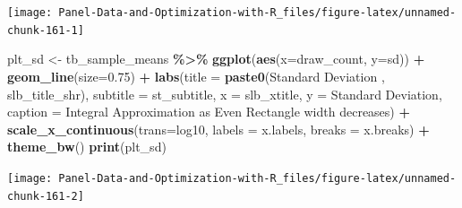 \documentclass[
]{book}
\newenvironment{Shaded}{\begin{snugshade}}{\end{snugshade}}
\newcommand{\DataTypeTok}[1]{\textcolor[rgb]{0.13,0.29,0.53}{#1}}
\newcommand{\FloatTok}[1]{\textcolor[rgb]{0.00,0.00,0.81}{#1}}
\newcommand{\KeywordTok}[1]{\textcolor[rgb]{0.13,0.29,0.53}{\textbf{#1}}}
\newcommand{\NormalTok}[1]{#1}
\newcommand{\OperatorTok}[1]{\textcolor[rgb]{0.81,0.36,0.00}{\textbf{#1}}}
\newcommand{\StringTok}[1]{\textcolor[rgb]{0.31,0.60,0.02}{#1}}
\begin{document}
\begin{center}\texttt{[image: Panel-Data-and-Optimization-with-R\_files/figure-latex/unnamed-chunk-161-1]} \end{center}

\begin{Shaded}
\begin{Highlighting}[]
\NormalTok{plt\_sd \textless{}{-}}\StringTok{ }\NormalTok{tb\_sample\_means }\OperatorTok{\%\textgreater{}\%}
\StringTok{  }\KeywordTok{ggplot}\NormalTok{(}\KeywordTok{aes}\NormalTok{(}\DataTypeTok{x=}\NormalTok{draw\_count, }\DataTypeTok{y=}\NormalTok{sd)) }\OperatorTok{+}
\StringTok{  }\KeywordTok{geom\_line}\NormalTok{(}\DataTypeTok{size=}\FloatTok{0.75}\NormalTok{) }\OperatorTok{+}
\StringTok{  }\KeywordTok{labs}\NormalTok{(}\DataTypeTok{title =} \KeywordTok{paste0}\NormalTok{(}\StringTok{\textquotesingle{}Standard Deviation \textquotesingle{}}\NormalTok{, slb\_title\_shr),}
       \DataTypeTok{subtitle =}\NormalTok{ st\_subtitle,}
       \DataTypeTok{x =}\NormalTok{ slb\_xtitle,}
       \DataTypeTok{y =} \StringTok{\textquotesingle{}Standard Deviation\textquotesingle{}}\NormalTok{,}
       \DataTypeTok{caption =} \StringTok{\textquotesingle{}Integral Approximation as Even Rectangle width decreases\textquotesingle{}}\NormalTok{) }\OperatorTok{+}
\StringTok{  }\KeywordTok{scale\_x\_continuous}\NormalTok{(}\DataTypeTok{trans=}\StringTok{\textquotesingle{}log10\textquotesingle{}}\NormalTok{, }\DataTypeTok{labels =}\NormalTok{ x.labels, }\DataTypeTok{breaks =}\NormalTok{ x.breaks) }\OperatorTok{+}
\StringTok{  }\KeywordTok{theme\_bw}\NormalTok{()}
\KeywordTok{print}\NormalTok{(plt\_sd)}
\end{Highlighting}
\end{Shaded}

\begin{center}\texttt{[image: Panel-Data-and-Optimization-with-R\_files/figure-latex/unnamed-chunk-161-2]} \end{center}
\end{document}
